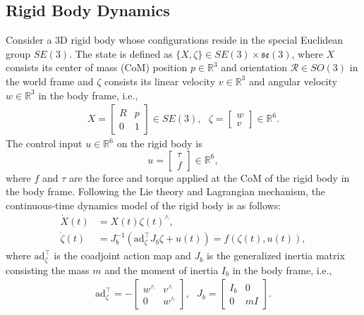 \documentclass[lettersize,journal]{IEEEtran}
\newcommand{\mR}{\mathcal{R}}
\begin{document}
\subsection{Rigid Body Dynamics}
Consider a 3D rigid body whose configurations reside in the special Euclidean group $SE(3)$. The state is defined as $\{X, \zeta\} \in SE(3)\times \mathfrak{se}(3)$, where $X$ consists its center of mass (CoM) position $p \in \mathbb{R}^3$ and orientation $\mR \in SO(3)$ in the world frame and $\zeta$ consists its linear velocity $v \in \mathbb{R}^3$ and angular velocity $w \in \mathbb{R}^3$ in the body frame, i.e.,
\begin{align}
    X = \begin{bmatrix}
        R & p \\ 0 & 1
    \end{bmatrix} \in SE(3), ~~~\zeta =\begin{bmatrix}
        w \\ v
    \end{bmatrix} \in \mathbb{R}^6. \label{definition}
\end{align}
The control input $u \in \mathbb{R}^6$ on the rigid body is 
\begin{equation}
    u = \begin{bmatrix}
         \tau \\f
    \end{bmatrix} \in \mathbb{R}^6,
\end{equation}
where $f$ and $\tau$ are the force and torque applied at the CoM of the rigid body in the body frame. Following the Lie theory and Lagrangian mechanism, the continuous-time dynamics model of the rigid body is as follows:
\begin{equation} \label{rigid-body-dynamics}
    \begin{aligned}
    \dot{X}(t) &= X(t)\zeta(t)^{\wedge},\\
       \dot{\zeta}(t)&= J_b ^{-1}(\text{ad}_{\zeta}^{\top}J_b \zeta +u(t)) = f(\zeta(t), u(t)),
\end{aligned}
\end{equation}
where $\text{ad}_\zeta^{\top}$ is the coadjoint action map and $J_b$ is the generalized inertia matrix consisting the mass $m$ and the moment of inertia $I_b$ in the body frame, i.e.,
\begin{align*}
    \text{ad}^{\top}_{\zeta} = -\begin{bmatrix}
         w^{\wedge} & v^{\wedge} \\ 0 & w^{\wedge}
    \end{bmatrix}, ~~~ J_b = \begin{bmatrix}
        I_b & 0 \\ 0 & mI
    \end{bmatrix}.
\end{align*}
\end{document}
